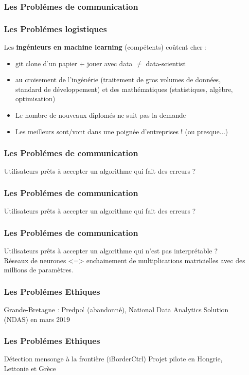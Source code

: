 \documentclass{formation}
\begin{document}
\begin{frame}
\frametitle{Les Problémes de communication}
\end{frame}

\begin{frame}
  \frametitle{Les Problémes logistiques}
  Les \textbf{ingénieurs en machine learning} (compétents) coûtent cher :
  \begin{itemize}
  \item git clone d'un papier + jouer avec data $\neq$ data-scientist
  \item au croisement de l'ingénérie (traitement de gros volumes de données, standard de développement) et des mathématiques (statistiques, algèbre, optimisation)
  \item Le nombre de nouveaux diplomés ne suit pas la demande
  \item Les meilleurs sont/vont dans une poignée d'entreprises ! (ou presque...)
  \end{itemize}
\end{frame}

\begin{frame}
  \frametitle{Les Problémes de communication}
  Utilisateurs prêts à accepter un algorithme qui fait des erreurs ?
\end{frame}

\begin{frame}
  \frametitle{Les Problémes de communication}
  Utilisateurs prêts à accepter un algorithme qui fait des erreurs ?
\end{frame}

\begin{frame}
  \frametitle{Les Problémes de communication}
  Utilisateurs prêts à accepter un algorithme qui n'est pas interprétable ?\\
  Réseaux de neurones <=> enchainement de multiplications matricielles avec des millions de paramètres.
\end{frame}

\begin{frame}
  \frametitle{Les Problémes Ethiques}
  Grande-Bretagne : Predpol (abandonné),  National Data Analytics Solution (NDAS) en mars 2019
\end{frame}

\begin{frame}
  \frametitle{Les Problémes Ethiques}
  Détection mensonge à la frontière (iBorderCtrl)
  \newline
  Projet pilote en Hongrie, Lettonie et Grèce
\end{frame}
\end{document}
